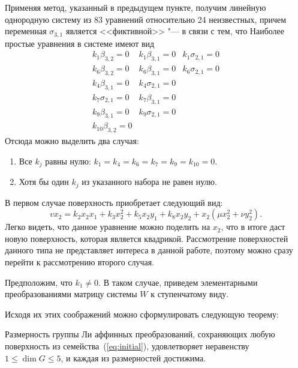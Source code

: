 \documentclass[../main.tex]{subfiles}
\begin{document}
Применяя метод, указанный в предыдущем пункте, получим линейную однородную систему из 83 уравнений относительно 24 неизвестных, причем переменная $\sigma_{3,1}$ является <<фиктивной>> "--- в связи с тем, что   Наиболее простые уравнения в системе имеют вид
\begin{equation}
\begin{matrix}
 k_1 \beta _{3,2}=0 &  k_1 \beta _{3,1}=0 &  k_1 \sigma _{2,1}=0 \\
 k_6 \beta _{3,2}=0 & k_6 \beta _{3,1}=0 & k_6 \sigma _{2,1}=0 \\
 k_4 \beta _{3,1}=0 &  k_4 \sigma _{2,1}=0 \\
 k_7 \sigma _{2,1}=0 & k_7 \beta _{3,1}=0 \\
 k_9 \beta _{3,1}=0 & k_9 \sigma _{2,1}=0 \\
 k_{10} \beta _{3,2}=0 &  & 
\end{matrix}
\end{equation}
Отсюда можно выделить два случая:
\begin{enumerate}
	\item Все $k_j$ равны нулю: $k_1 = k_4 = k_6 = k_7 = k_9 = k_{10} = 0$.
	\item Хотя бы один $k_j$ из указанного набора не равен нулю.
\end{enumerate}
В первом случае поверхность приобретает следующий вид:
\begin{equation*}
v x_2 = k_2 x_2 x_1 + k_3 x_2^2 + k_5 x_2 y_1 + k_8 x_2 y_2 + x_2 (\mu x_2^2 + \nu y_2^2).
\end{equation*}
Легко видеть, что данное уравнение можно поделить на $x_2$, что в итоге даст новую поверхность, которая является квадрикой. Рассмотрение поверхностей данного типа не представляет интереса в данной работе, поэтому можно сразу перейти к рассмотрению второго случая.

Предположим, что $k_1 \ne 0 $. В таком случае, приведем элементарными преобразованиями матрицу системы $W$ к ступенчатому виду.

Исходя их этих соображений можно сформулировать следующую теорему:

\begin{theorem} Размерность группы Ли аффинных преобразований, сохраняющих любую поверхность из семейства~(\ref{eq:initial}), удовлетворяет неравенству $1 \le \dim G \le 5$, и каждая из размерностей достижима.
\end{theorem}
\end{document}
